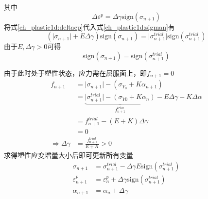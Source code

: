 其中
\begin{equation}\label{ch_plastic1d:deltaep}
    \Delta \varepsilon^p = \Delta \gamma \mathrm{sign}(\sigma_{n+1})
\end{equation}
将式\eqref{ch_plastic1d:deltaep}代入式\eqref{ch_plastic1d:sigman}有
\begin{equation}
    (\vert \sigma_{n+1} \vert + E\Delta \gamma) \mathrm{sign}(\sigma_{n+1}) = \vert \sigma_{n+1}^{trial} \vert \mathrm{sign}(\sigma_{n+1}^{trial})
\end{equation}
由于$E,\Delta \gamma > 0$可得
\begin{equation}
    \mathrm{sign}(\sigma_{n+1}) = \mathrm{sign}(\sigma_{n+1}^{trial})
\end{equation} \par
由于此时处于塑性状态，应力需在屈服面上，即$f_{n+1}=0$
\begin{equation}
    \begin{split}
        f_{n+1} &= \vert \sigma_{n+1} \vert - (\sigma_{Y_0} + K \alpha_{n+1}) \\
                &= \underbrace{\vert \sigma_{n+1}^{trial} \vert - (\sigma_{Y0} + K \alpha_n)}_{f^{trial}_{n+1}} - E \Delta \gamma - K \Delta \alpha \\
                &= f^{trial}_{n+1} - (E+K) \Delta \gamma \\
                &=0 \\
        \Rightarrow \Delta \gamma &= \frac{f^{trial}_{n+1}}{E+K} >0
    \end{split}
\end{equation}
求得塑性应变增量大小后即可更新所有变量
\begin{subequations}
\begin{align}
    \sigma_{n+1} &= \sigma_{n+1}^{trial} - \Delta \gamma E \mathrm{sign}(\sigma_{n+1}^{trial}) \\
    \varepsilon_{n+1}^p &= \varepsilon_n^p + \Delta \gamma \mathrm{sign}(\sigma_{n+1}^{trial}) \\
    \alpha_{n+1} &= \alpha_n + \Delta \gamma
\end{align}
\end{subequations}
